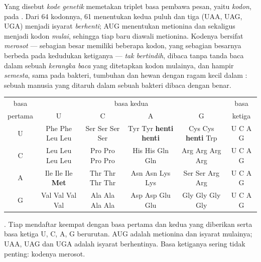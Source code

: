 \begin{definition}\label{def:b1:gene-expression:code}
Yang disebut \emph{kode genetik} memetakan triplet basa pembawa pesan,
yaitu \emph{kodon}, pada . Dari 64 kodonnya, 61 menentukan
kedua puluh  dan tiga (UAA, UAG, UGA) menjadi isyarat
\emph{berhenti}; AUG menentukan metionina dan sekaligus menjadi kodon
\emph{mulai}, sehingga tiap  baru diawali metionina. Kodenya
bersifat \emph{merosot} --- sebagian besar  memiliki
beberapa kodon, yang sebagian besarnya berbeda pada kedudukan
ketiganya ---
\emph{tak bertindih}, dibaca tanpa tanda baca dalam sebuah \emph{kerangka
baca} yang ditetapkan kodon mulainya, dan hampir \emph{semesta}, sama
pada bakteri, tumbuhan dan hewan dengan ragam kecil dalam :
sebuah  manusia yang ditaruh dalam sebuah bakteri dibaca dengan
benar.
\end{definition}

\begin{omfigure}
\begin{center}
\footnotesize
\begin{tabular}{c|cccc|c}
\hline
basa & \multicolumn{4}{c|}{basa kedua} & basa \\
pertama & U & C & A & G & ketiga \\
\hline
U & Phe Phe Leu Leu & Ser Ser Ser Ser & Tyr Tyr \textbf{henti} \textbf{henti} & Cys Cys \textbf{henti} Trp & U C A G \\
C & Leu Leu Leu Leu & Pro Pro Pro Pro & His His Gln Gln & Arg Arg Arg Arg & U C A G \\
A & Ile Ile Ile \textbf{Met} & Thr Thr Thr Thr & Asn Asn Lys Lys & Ser Ser Arg Arg & U C A G \\
G & Val Val Val Val & Ala Ala Ala Ala & Asp Asp Glu Glu & Gly Gly Gly Gly & U C A G \\
\hline
\end{tabular}
\end{center}

{\small {}. Tiap  mendaftar keempat  dengan basa
pertama dan kedua yang diberikan serta basa ketiga U, C, A, G
berurutan. AUG adalah metionina dan isyarat mulainya; UAA, UAG dan UGA
adalah isyarat berhentinya. Basa ketiganya sering tidak penting:
kodenya merosot.}
\end{omfigure}

